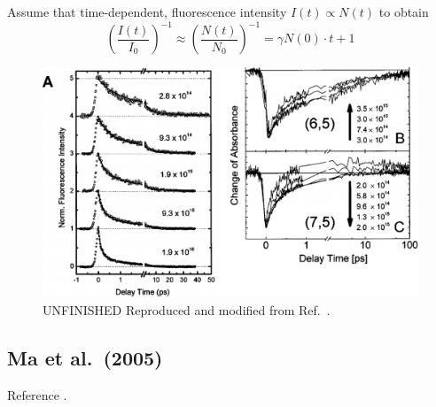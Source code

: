 Assume that time-dependent, fluorescence intensity $I(t) \propto N(t)$ to obtain
\begin{equation}
  	\left( \dfrac{I(t)}{I_0} \right)^{-1} \approx \left( \dfrac{N(t)}{N_0} \right)^{-1} = \gamma N(0) \cdot t + 1
\end{equation}

\begin{figure}[ht]
	\centering
	\includegraphics[scale=1.4]{images/chapter_prior_works/fluorescence_abs_ma_2004}
	\caption{{\color{red} UNFINISHED} Reproduced and modified from Ref.\ \cite{ma2004ultrafast}.}
\end{figure}

\subsection{Ma et al.\ (2005)}

Reference \cite{ma2005femtosecond}.

